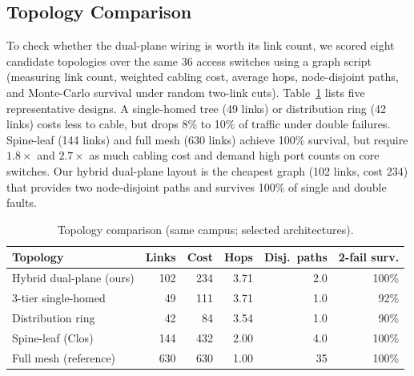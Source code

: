 \documentclass[conference]{IEEEtran}
\begin{document}
\subsection{Topology Comparison}\label{sec:topo}
To check whether the dual-plane wiring is worth its link count, we scored eight candidate topologies over the same 36 access switches using a graph script (measuring link count, weighted cabling cost, average hops, node-disjoint paths, and Monte-Carlo survival under random two-link cuts). Table~\ref{tab:topo} lists five representative designs. A single-homed tree (49 links) or distribution ring (42 links) costs less to cable, but drops 8\% to 10\% of traffic under double failures. Spine-leaf (144 links) and full mesh (630 links) achieve 100\% survival, but require $1.8\times$ and $2.7\times$ as much cabling cost and demand high port counts on core switches. Our hybrid dual-plane layout is the cheapest graph (102 links, cost 234) that provides two node-disjoint paths and survives 100\% of single and double faults.

\begin{table}[t]
\caption{Topology comparison (same campus; selected architectures).}
\label{tab:topo}
\centering
\footnotesize
\begin{tabular}{@{}lrrrrr@{}}
\toprule
Topology & Links & Cost & Hops & Disj.\ paths & 2-fail surv. \\
\midrule
Hybrid dual-plane (ours) & 102 & 234 & 3.71 & 2.0 & 100\% \\
3-tier single-homed      & 49  & 111 & 3.71 & 1.0 & 92\% \\
Distribution ring        & 42  & 84  & 3.54 & 1.0 & 90\% \\
Spine-leaf (Clos)        & 144 & 432 & 2.00 & 4.0 & 100\% \\
Full mesh (reference)    & 630 & 630 & 1.00 & 35  & 100\% \\
\bottomrule
\end{tabular}
\end{table}

\end{document}
